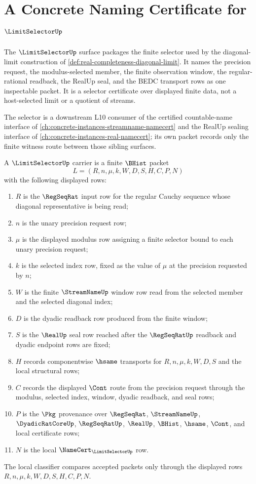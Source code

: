 \chapter{A Concrete Naming Certificate for $\LimitSelectorUp$}
\label{ch:concrete-instances-limitselector-namecert}

The $\LimitSelectorUp$ surface packages the finite selector used by the diagonal-limit construction of \autoref{def:real-completeness-diagonal-limit}. It names the precision request, the modulus-selected member, the finite observation window, the regular-rational readback, the RealUp seal, and the BEDC transport rows as one inspectable packet. It is a selector certificate over displayed finite data, not a host-selected limit or a quotient of streams.

The selector is a downstream L10 consumer of the certified countable-name interface of \autoref{ch:concrete-instances-streamname-namecert} and the RealUp sealing interface of \autoref{ch:concrete-instances-real-namecert}; its own packet records only the finite witness route between those sibling surfaces.

\begin{definition}
\label{def:limit-selector-carrier}
A $\LimitSelectorUp$ carrier is a finite $\BHist$ packet
$$
L=(R,n,\mu,k,W,D,S,H,C,P,N)
$$
with the following displayed rows:
\begin{enumerate}
\item $R$ is the $\RegSeqRat$ input row for the regular Cauchy sequence whose diagonal representative is being read;
\item $n$ is the unary precision request row;
\item $\mu$ is the displayed modulus row assigning a finite selector bound to each unary precision request;
\item $k$ is the selected index row, fixed as the value of $\mu$ at the precision requested by $n$;
\item $W$ is the finite $\StreamNameUp$ window row read from the selected member and the selected diagonal index;
\item $D$ is the dyadic readback row produced from the finite window;
\item $S$ is the $\RealUp$ seal row reached after the $\RegSeqRatUp$ readback and dyadic endpoint rows are fixed;
\item $H$ records componentwise $\hsame$ transports for $R,n,\mu,k,W,D,S$ and the local structural rows;
\item $C$ records the displayed $\Cont$ route from the precision request through the modulus, selected index, window, dyadic readback, and seal rows;
\item $P$ is the $\Pkg$ provenance over $\RegSeqRat$, $\StreamNameUp$, $\DyadicRatCoreUp$, $\RegSeqRatUp$, $\RealUp$, $\BHist$, $\hsame$, $\Cont$, and local certificate rows;
\item $N$ is the local $\NameCert_{\LimitSelectorUp}$ row.
\end{enumerate}
The local classifier compares accepted packets only through the displayed rows $R,n,\mu,k,W,D,S,H,C,P,N$.
\end{definition}

